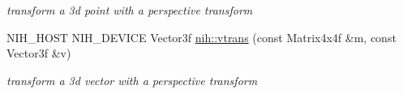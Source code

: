 \begin{DoxyCompactItemize}
\begin{DoxyCompactList}\small\item\em transform a 3d point with a perspective transform \end{DoxyCompactList}\item 
\hypertarget{group__matrices_ga90f6d2850e286d194db09300a4d99537}{
\-N\-I\-H\-\_\-\-H\-O\-S\-T \-N\-I\-H\-\_\-\-D\-E\-V\-I\-C\-E \-Vector3f \hyperlink{group__matrices_ga90f6d2850e286d194db09300a4d99537}{nih\-::vtrans} (const \-Matrix4x4f \&m, const \-Vector3f \&v)}
\label{group__matrices_ga90f6d2850e286d194db09300a4d99537}

\begin{DoxyCompactList}\small\item\em transform a 3d vector with a perspective transform \end{DoxyCompactList}\end{DoxyCompactItemize}
